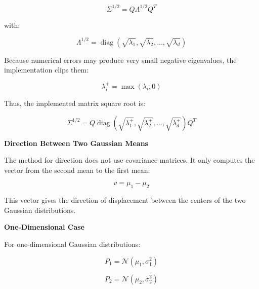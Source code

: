 \documentclass{book}
\providecommand{\ProjectDeepHeading}[2]{%
    \par\medskip\noindent\textbf{#2}\par\smallskip
}
\begin{document}
        \[
            \ensuremath{\Sigma}^{1/2}
            =
            Q
            \ensuremath{\Lambda}^{1/2}
            Q^T
        \]
        
        with:
        
        \[
            \ensuremath{\Lambda}^{1/2}
            =
            \operatorname{diag}
            \left(
                \sqrt{\ensuremath{\lambda}_1},
                \sqrt{\ensuremath{\lambda}_2},
                \ldots,
                \sqrt{\ensuremath{\lambda}_d}
            \right)
        \]
        
        Because numerical errors may produce very small negative eigenvalues, the implementation clips them:
        
        \[
            \ensuremath{\lambda}_i^{+}
            =
            \max
            \left(
                \ensuremath{\lambda}_i,
            0
            \right)
        \]
        
        Thus, the implemented matrix square root is:
        
        \[
            \ensuremath{\Sigma}^{1/2}
            =
            Q
            \operatorname{diag}
            \left(
                \sqrt{\ensuremath{\lambda}_1^{+}},
                \sqrt{\ensuremath{\lambda}_2^{+}},
                \ldots,
                \sqrt{\ensuremath{\lambda}_d^{+}}
            \right)
            Q^T
        \]
    
    
    \ProjectDeepHeading{6}{Direction Between Two Gaussian Means}
        
        The method for direction does not use covariance matrices. It only computes the vector from the second mean to the first mean:
        
        \[
            v
            =
            \ensuremath{\mu}_1
            -
            \ensuremath{\mu}_2
        \]
        
        This vector gives the direction of displacement between the centers of the two Gaussian distributions.
    
    
    \ProjectDeepHeading{6}{One-Dimensional Case}
        
        For one-dimensional Gaussian distributions:
        
        \[
            P_1
            =
            \mathcal{N}
            \left(
                \ensuremath{\mu}_1,
                \ensuremath{\sigma}_1^2
            \right)
        \]
        
        \[
            P_2
            =
            \mathcal{N}
            \left(
                \ensuremath{\mu}_2,
                \ensuremath{\sigma}_2^2
            \right)
        \]
        
\end{document}
